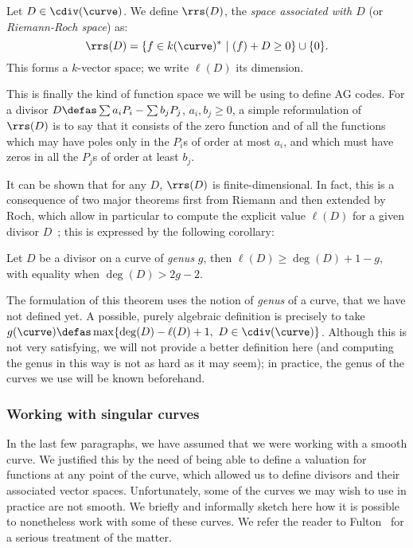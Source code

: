 \begin{defi}
Let $D \in \cdiv(\curve)$. We define $\rrs(D)$, the \emph{space associated with $D$} (or \emph{Riemann-Roch space}) as:
\[
\rrs(D) = \{f \in k(\curve)^*~|~(f) + D \geq 0\} \cup \{0\}.
\]
This forms a $k$-vector space; we write $\ell(D)$ its dimension.
\end{defi}

This is finally the kind of function space we will be using to define AG codes. For a divisor
$D \defas \sum a_iP_i - \sum b_jP_j$, $a_i, b_j \geq 0$, a simple reformulation of $\rrs(D)$ is to say that it consists of the zero function and of all the functions
which may have poles only in the $P_i$s of order at most $a_i$, and which must have zeros in all the $P_j$s of order
at least $b_j$.

It can be shown that for any $D$, $\rrs(D)$ is finite-dimensional. In fact, this is a consequence of two major theorems first from Riemann and then extended by Roch, which allow in particular to compute the explicit value $\ell(D)$
for a given divisor $D$~; this is expressed by the following corollary:

\begin{cor}
Let $D$ be a divisor on a curve of \emph{genus} $g$, then $\ell(D) \geq \deg(D) + 1 - g$, with equality
when $\deg(D) > 2g - 2$.
\end{cor}

The formulation of this theorem uses the notion of \emph{genus} of a curve, that we have not defined yet. A possible, purely algebraic definition is precisely to take
$g(\curve) \defas \max \{\deg(D) - \ell(D) + 1,~D \in \cdiv(\curve)\}$. Although this is not very satisfying, we will not provide a better definition here (and computing
the genus in this way is not as hard as it may seem); in practice, the genus
of the curves we use will be known beforehand.

\subsubsection{Working with singular curves}
\label{sec:nonsingmod}

In the last few paragraphs, we have assumed that we were working with a smooth curve. We justified this by the need of being able to define a valuation for functions
at any point of the curve, which allowed us to define divisors and their associated vector spaces.
Unfortunately, some of the curves we may wish to use in practice are not smooth. We briefly and informally sketch here how it is possible to nonetheless work with some
of these curves. We refer the reader to \eg Fulton~\cite[Chap. 7]{fulton} for a serious treatment of the matter.

